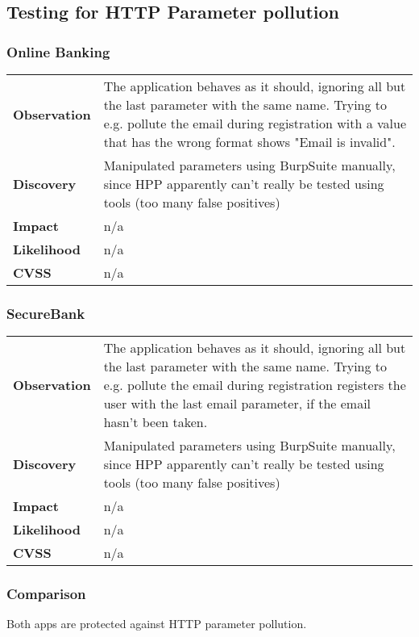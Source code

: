 \subsection{Testing for HTTP Parameter pollution}

\subsubsection*{Online Banking}

\begin{tabular}{l|p{10cm}}
\textbf{Observation} & The application behaves as it should, ignoring all but the last parameter with the same name. Trying to e.g. pollute the email during registration with a value that has the wrong format shows "Email is invalid". \\
\textbf{Discovery} & Manipulated parameters using BurpSuite manually, since HPP apparently can't really be tested using tools (too many false positives)\\
\textbf{Impact} & n/a \\
\textbf{Likelihood} & n/a \\
\textbf{CVSS} & n/a \\
\end{tabular}

\subsubsection*{SecureBank}

\begin{tabular}{l|p{10cm}}
\textbf{Observation} & The application behaves as it should, ignoring all but the last parameter with the same name. Trying to e.g. pollute the email during registration registers the user with the last email parameter, if the email hasn't been taken.\\
\textbf{Discovery} & Manipulated parameters using BurpSuite manually, since HPP apparently can't really be tested using tools (too many false positives)\\
\textbf{Impact} & n/a \\
\textbf{Likelihood} & n/a \\
\textbf{CVSS} & n/a \\
\end{tabular}

\subsubsection*{Comparison}
Both apps are protected against HTTP parameter pollution.

